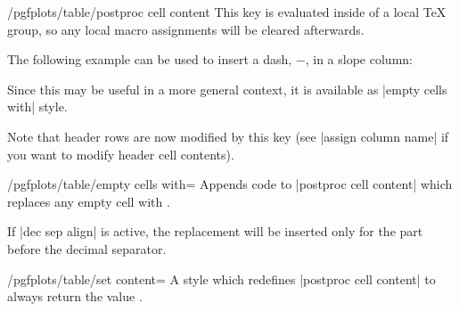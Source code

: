 \begin{codekey}{/pgfplots/table/postproc cell content}
    This key is evaluated inside of a local \TeX{} group, so any local macro
    assignments will be cleared afterwards.

    The following example can be used to insert a dash, $-$, in a slope column:
\begin{codeexample}[pre={\begin{lateximage}},post={\end{lateximage}}]

\end{codeexample}
    Since this may be useful in a more general context, it is available as
    |empty cells with| style.

    Note that header rows are now modified by this key (see
    |assign column name| if you want to modify header cell contents).
\end{codekey}

\begin{stylekey}{/pgfplots/table/empty cells with=}
    Appends code to |postproc cell content| which replaces any empty cell with
    .

    If |dec sep align| is active, the replacement will be inserted only for the
    part before the decimal separator.
\end{stylekey}

\begin{stylekey}{/pgfplots/table/set content=}
    A style which redefines |postproc cell content| to always return the value
    .
\end{stylekey}

